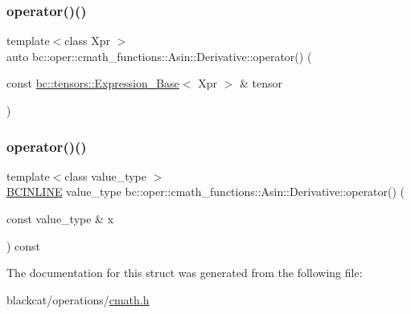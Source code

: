 \mbox{\label{structbc_1_1oper_1_1cmath__functions_1_1Asin_1_1Derivative_a4b4bcc90055288853fa4d0501fe0f732}} 
\subsubsection{\texorpdfstring{operator()()}{operator()()}\hspace{0.1cm}{\footnotesize\ttfamily [2/3]}}
{\footnotesize\ttfamily template$<$class Xpr $>$ \\
auto bc\+::oper\+::cmath\+\_\+functions\+::\+Asin\+::\+Derivative\+::operator() (\begin{DoxyParamCaption}\item[{const \hyperlink{classbc_1_1tensors_1_1Expression__Base}{bc\+::tensors\+::\+Expression\+\_\+\+Base}$<$ Xpr $>$ \&}]{tensor }\end{DoxyParamCaption})\hspace{0.3cm}{\ttfamily [inline]}}

\mbox{\label{structbc_1_1oper_1_1cmath__functions_1_1Asin_1_1Derivative_a73b61a0892ca2ba608401806ef8f465e}} 
\subsubsection{\texorpdfstring{operator()()}{operator()()}\hspace{0.1cm}{\footnotesize\ttfamily [3/3]}}
{\footnotesize\ttfamily template$<$class value\+\_\+type $>$ \\
\hyperlink{common_8h_a6699e8b0449da5c0fafb878e59c1d4b1}{B\+C\+I\+N\+L\+I\+NE} value\+\_\+type bc\+::oper\+::cmath\+\_\+functions\+::\+Asin\+::\+Derivative\+::operator() (\begin{DoxyParamCaption}\item[{const value\+\_\+type \&}]{x }\end{DoxyParamCaption}) const\hspace{0.3cm}{\ttfamily [inline]}}



The documentation for this struct was generated from the following file\+:\begin{DoxyCompactItemize}
\item 
blackcat/operations/\hyperlink{cmath_8h}{cmath.\+h}\end{DoxyCompactItemize}
